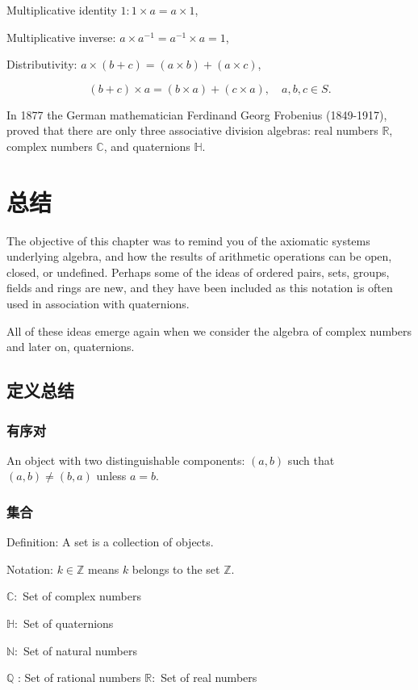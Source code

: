 Multiplicative identity $1: 1 \times a=a \times 1$,

Multiplicative inverse: $a \times a^{-1}=a^{-1} \times a=1$,

Distributivity: $a \times(b+c)=(a \times b)+(a \times c)$,

$$
(b+c) \times a=(b \times a)+(c \times a), \quad a, b, c \in S .
$$

In 1877 the German mathematician Ferdinand Georg Frobenius (1849-1917), proved that there are only three associative division algebras: real numbers $\mathbb{R}$, complex numbers $\mathbb{C}$, and quaternions $\mathbb{H}$.

\section{总结}
The objective of this chapter was to remind you of the axiomatic systems underlying algebra, and how the results of arithmetic operations can be open, closed, or undefined. Perhaps some of the ideas of ordered pairs, sets, groups, fields and rings are new, and they have been included as this notation is often used in association with quaternions.

All of these ideas emerge again when we consider the algebra of complex numbers and later on, quaternions.

\subsection{定义总结}
\subsubsection*{有序对}
An object with two distinguishable components: $(a, b)$ such that $(a, b) \neq(b, a)$ unless $a=b$.

\subsubsection*{集合}
Definition: A set is a collection of objects.

Notation: $k \in \mathbb{Z}$ means $k$ belongs to the set $\mathbb{Z}$.

$\mathbb{C}:$ Set of complex numbers

$\mathbb{H}:$ Set of quaternions

$\mathbb{N}:$ Set of natural numbers

$\mathbb{Q}$ : Set of rational numbers $\mathbb{R}:$ Set of real numbers

